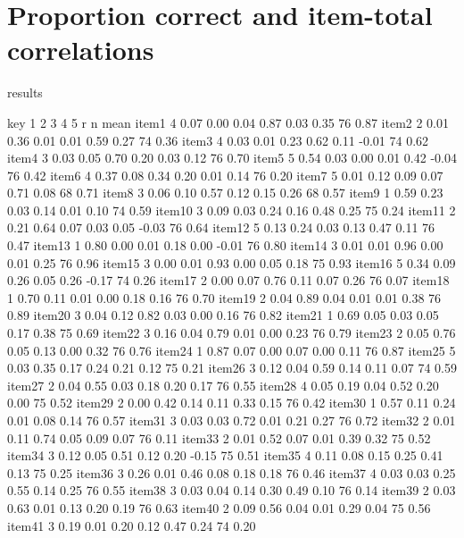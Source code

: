 \documentclass[10pt,man]{apa6}\usepackage{graphicx, color}
\begin{document}
\section{\label{output:proportion}Proportion correct and item-total correlations}
\begin{Schunk}
\begin{Sinput}
results
\end{Sinput}
\begin{Soutput}
        key    1    2    3    4    5     r  n mean
item1     4 0.07 0.00 0.04 0.87 0.03  0.35 76 0.87
item2     2 0.01 0.36 0.01 0.01 0.59  0.27 74 0.36
item3     4 0.03 0.01 0.23 0.62 0.11 -0.01 74 0.62
item4     3 0.03 0.05 0.70 0.20 0.03  0.12 76 0.70
item5     5 0.54 0.03 0.00 0.01 0.42 -0.04 76 0.42
item6     4 0.37 0.08 0.34 0.20 0.01  0.14 76 0.20
item7     5 0.01 0.12 0.09 0.07 0.71  0.08 68 0.71
item8     3 0.06 0.10 0.57 0.12 0.15  0.26 68 0.57
item9     1 0.59 0.23 0.03 0.14 0.01  0.10 74 0.59
item10    3 0.09 0.03 0.24 0.16 0.48  0.25 75 0.24
item11    2 0.21 0.64 0.07 0.03 0.05 -0.03 76 0.64
item12    5 0.13 0.24 0.03 0.13 0.47  0.11 76 0.47
item13    1 0.80 0.00 0.01 0.18 0.00 -0.01 76 0.80
item14    3 0.01 0.01 0.96 0.00 0.01  0.25 76 0.96
item15    3 0.00 0.01 0.93 0.00 0.05  0.18 75 0.93
item16    5 0.34 0.09 0.26 0.05 0.26 -0.17 74 0.26
item17    2 0.00 0.07 0.76 0.11 0.07  0.26 76 0.07
item18    1 0.70 0.11 0.01 0.00 0.18  0.16 76 0.70
item19    2 0.04 0.89 0.04 0.01 0.01  0.38 76 0.89
item20    3 0.04 0.12 0.82 0.03 0.00  0.16 76 0.82
item21    1 0.69 0.05 0.03 0.05 0.17  0.38 75 0.69
item22    3 0.16 0.04 0.79 0.01 0.00  0.23 76 0.79
item23    2 0.05 0.76 0.05 0.13 0.00  0.32 76 0.76
item24    1 0.87 0.07 0.00 0.07 0.00  0.11 76 0.87
item25    5 0.03 0.35 0.17 0.24 0.21  0.12 75 0.21
item26    3 0.12 0.04 0.59 0.14 0.11  0.07 74 0.59
item27    2 0.04 0.55 0.03 0.18 0.20  0.17 76 0.55
item28    4 0.05 0.19 0.04 0.52 0.20  0.00 75 0.52
item29    2 0.00 0.42 0.14 0.11 0.33  0.15 76 0.42
item30    1 0.57 0.11 0.24 0.01 0.08  0.14 76 0.57
item31    3 0.03 0.03 0.72 0.01 0.21  0.27 76 0.72
item32    2 0.01 0.11 0.74 0.05 0.09  0.07 76 0.11
item33    2 0.01 0.52 0.07 0.01 0.39  0.32 75 0.52
item34    3 0.12 0.05 0.51 0.12 0.20 -0.15 75 0.51
item35    4 0.11 0.08 0.15 0.25 0.41  0.13 75 0.25
item36    3 0.26 0.01 0.46 0.08 0.18  0.18 76 0.46
item37    4 0.03 0.03 0.25 0.55 0.14  0.25 76 0.55
item38    3 0.03 0.04 0.14 0.30 0.49  0.10 76 0.14
item39    2 0.03 0.63 0.01 0.13 0.20  0.19 76 0.63
item40    2 0.09 0.56 0.04 0.01 0.29  0.04 75 0.56
item41    3 0.19 0.01 0.20 0.12 0.47  0.24 74 0.20

\end{Soutput}
\end{Schunk}
\end{document}
